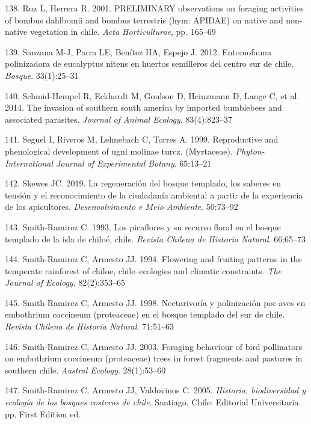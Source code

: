\documentclass[
]{article}
\begin{document}
\leavevmode\hypertarget{ref-RN155}{}%
138. Ruz L, Herrera R. 2001. PRELIMINARY observations on foraging
activities of bombus dahlbomii and bombus terrestris (hym: APIDAE) on
native and non-native vegetation in chile. \emph{Acta Horticulturae},
pp. 165--69

\leavevmode\hypertarget{ref-RN66}{}%
139. Sanzana M-J, Parra LE, Benítez HA, Espejo J. 2012. Entomofauna
polinizadora de eucalyptus nitens en huertos semilleros del centro sur
de chile. \emph{Bosque}. 33(1):25--31

\leavevmode\hypertarget{ref-RN67}{}%
140. Schmid-Hempel R, Eckhardt M, Goulson D, Heinzmann D, Lange C, et
al. 2014. The invasion of southern south america by imported bumblebees
and associated parasites. \emph{Journal of Animal Ecology}.
83(4):823--37

\leavevmode\hypertarget{ref-RN96}{}%
141. Seguel I, Riveros M, Lehnebach C, Torres A. 1999. Reproductive and
phenological development of ugni molinae turcz. (Myrtaceae).
\emph{Phyton-International Journal of Experimental Botany}. 65:13--21

\leavevmode\hypertarget{ref-RN92}{}%
142. Skewes JC. 2019. La regeneración del bosque templado, los saberes
en tensión y el reconocimiento de la ciudadanía ambiental a partir de la
experiencia de los apicultores. \emph{Desenvolvimento e Meio Ambiente}.
50:73--92

\leavevmode\hypertarget{ref-RN72}{}%
143. Smith-Ramirez C. 1993. Los picaflores y su recurso floral en el
bosque templado de la isla de chiloé, chile. \emph{Revista Chilena de
Historia Natural}. 66:65--73

\leavevmode\hypertarget{ref-RN69}{}%
144. Smith-Ramirez C, Armesto JJ. 1994. Flowering and fruiting patterns
in the temperate rainforest of chiloe, chile--ecologies and climatic
constraints. \emph{The Journal of Ecology}. 82(2):353--65

\leavevmode\hypertarget{ref-RN70}{}%
145. Smith-Ramirez C, Armesto JJ. 1998. Nectarivoría y polinización por
aves en embothrium coccineum (proteaceae) en el bosque templado del sur
de chile. \emph{Revista Chilena de Historia Natural}. 71:51--63

\leavevmode\hypertarget{ref-RN71}{}%
146. Smith-Ramirez C, Armesto JJ. 2003. Foraging behaviour of bird
pollinators on embothrium coccineum (proteaceae) trees in forest
fragments and pastures in southern chile. \emph{Austral Ecology}.
28(1):53--60

\leavevmode\hypertarget{ref-RN98}{}%
147. Smith-Ramirez C, Armesto JJ, Valdovinos C. 2005. \emph{Historia,
biodiversidad y ecología de los bosques costeros de chile}. Santiago,
Chile: Editorial Universitaria. pp. First Edition ed.
\end{document}
